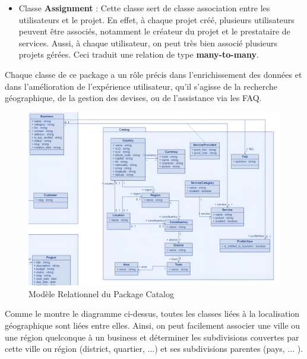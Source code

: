 {\begin{itemize}
    \item Classe \textbf{Assignment} : Cette classe sert de classe association entre les utilisateurs et le projet. En effet, à chaque projet créé, plusieurs utilisateurs peuvent être associés, notamment le créateur du projet et le prestataire de services. Aussi, à chaque utilisateur, on peut très bien associé plusieurs projets gérées. Ceci traduit une relation de type \textbf{many-to-many}. 

\end{itemize}

    \vspace{0.35cm}

Chaque classe de ce package a un rôle précis dans l'enrichissement des données et dans l'amélioration de l'expérience utilisateur, qu'il s'agisse de la recherche géographique, de la gestion des devises, ou de l'assistance via les FAQ. 

    \vspace{0.35cm}

\begin{figure}[H]
\begin{center}
\includegraphics[width=15cm]{assets/diagrams/CatalogUC1.png}
\end{center}
\caption{Modèle Relationnel du Package Catalog}
\end{figure}
\vspace{0.35cm}

Comme le montre le diagramme ci-dessus, toutes les classes liées à la localisation géographique sont liées entre elles. Ainsi, on peut facilement associer une ville ou une région quelconque à un business et déterminer les subdivisions couvertes par cette ville ou région (district, quartier, ...) et ses subdivisions parentes (pays, ... ).

}

